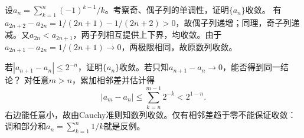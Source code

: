 设\(a_n=\sum_{k=1}^{n}(-1)^{k-1}/k\)。考察奇、偶子列的单调性，证明\(\{a_n\}\)收敛。
\solutionanswer
有\(a_{2n+2}-a_{2n}=1/(2n+1)-1/(2n+2)>0\)，故偶子列递增；同理，奇子列递减。又\(a_{2n}<a_{2n+1}\)，两子列相互提供上下界，均收敛。由于\(a_{2n+1}-a_{2n}=1/(2n+1)\to0\)，两极限相同，故原数列收敛。


若\(|a_{n+1}-a_n|\le2^{-n}\)，证明\(\{a_n\}\)收敛。若只知\(a_{n+1}-a_n\to0\)，能否得到同一结论？
\solutionanswer
对任意\(m>n\)，累加相邻差并估计得
\[
|a_m-a_n|\le\sum_{k=n}^{m-1}2^{-k}<2^{1-n}.
\]
右边能任意小，故由Cauchy准则知数列收敛。仅有相邻差趋于零不能保证收敛：调和部分和\(a_n=\sum_{k=1}^n1/k\)就是反例。
\par
